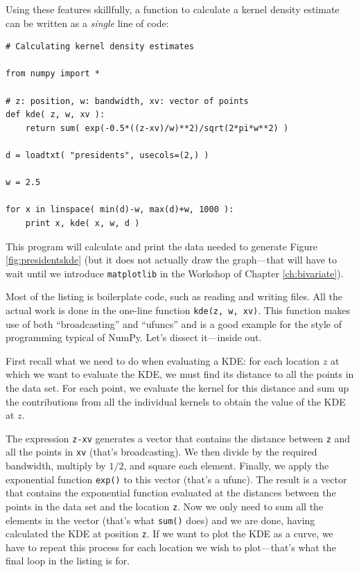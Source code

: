 Using these features skillfully, a function to calculate a kernel
density estimate can be written as a \emph{single} line of code:

\begin{verbatim}
# Calculating kernel density estimates

from numpy import *

# z: position, w: bandwidth, xv: vector of points
def kde( z, w, xv ):
    return sum( exp(-0.5*((z-xv)/w)**2)/sqrt(2*pi*w**2) )

d = loadtxt( "presidents", usecols=(2,) )

w = 2.5

for x in linspace( min(d)-w, max(d)+w, 1000 ):
    print x, kde( x, w, d )
\end{verbatim}

This program will calculate and print the data needed to generate
Figure \ref{fig:presidentskde} (but it does not actually draw the
graph---that will have to wait until we introduce \texttt{matplotlib}
in the Workshop of Chapter \ref{ch:bivariate}).

Most of the listing is boilerplate code, such as reading and writing
files.  All the actual work is done in the one-line function
\texttt{kde(z, w, xv)}. This function makes use of both
``broadcasting'' and ``ufuncs'' and is a good example for the style of
programming typical of NumPy. Let's dissect it---inside out.

First recall what we need to do when evaluating a KDE: for each
location $z$ at which we want to evaluate the KDE, we must find its
distance to all the points in the data set. For each point, we
evaluate the kernel for this distance and sum up the contributions
from all the individual kernels to obtain the value of the KDE at $z$.

The expression \texttt{z-xv} generates a vector that contains the
distance between \texttt{z} and all the points in \texttt{xv} (that's
broadcasting). We then divide by the required bandwidth, multiply by
$1/2$, and square each element. Finally, we apply the exponential
function \texttt{exp()} to this vector (that's a ufunc).  The result
is a vector that contains the exponential function evaluated at the
distances between the points in the data set and the location
\texttt{z}.  Now we only need to sum all the elements in the vector
(that's what \texttt{sum()} does) and we are done, having calculated
the KDE at position \texttt{z}. If we want to plot the KDE as a curve,
we have to repeat this process for each location we wish to
plot---that's what the final loop in the listing is for.

